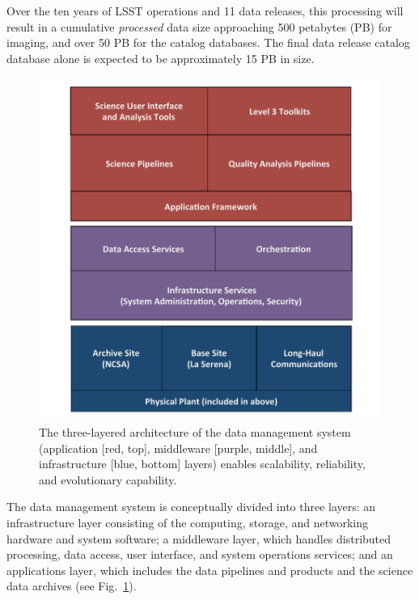 \documentclass{emulateapj}
\begin{document}
Over the ten years of LSST operations and 11 data releases, this processing will result in a cumulative {\em processed} data size 
approaching 500 petabytes (PB) for imaging, and over 50 PB for the
catalog databases. The final data release catalog database alone is expected 
to be approximately 15 PB in size.
\\

\begin{figure}
%
%
\hskip -0.2in
\includegraphics[width=1.1\hsize,clip]{DMsandwich.pdf}
\caption{The three-layered architecture of the data management system 
(application [red, top], middleware [purple, middle], and infrastructure [blue, bottom] layers) enables scalability, reliability, and evolutionary capability.} 
\label{Fig:DM1}
\end{figure}

The data management system is conceptually divided into three layers: an
infrastructure layer consisting of the computing, storage, and
networking hardware and system software; a middleware layer, which
handles distributed processing, data access, user interface, and
system operations services; and an applications layer, which includes
the data pipelines and products and the science data archives (see
Fig.~\ref{Fig:DM1}).
\end{document}
